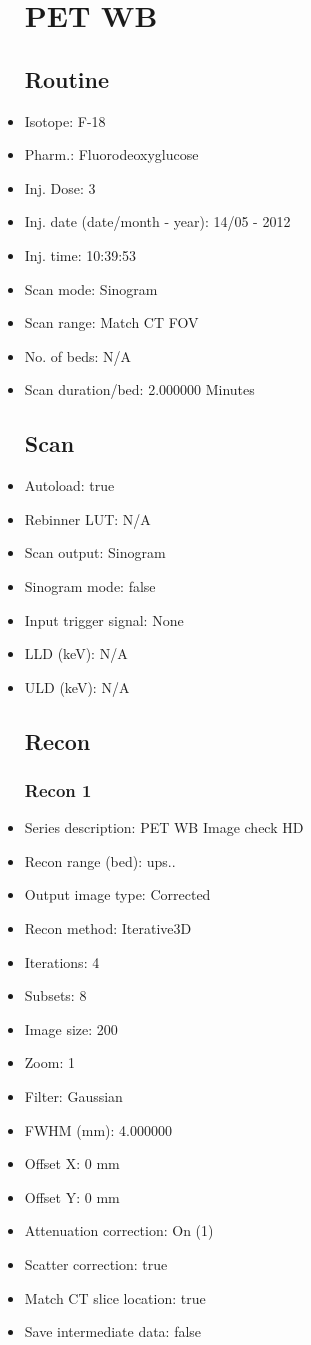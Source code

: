 \documentclass[12pt]{article}
\begin{document}
\begin{itemize}
\section{PET WB}
\subsection{Routine}
\item Isotope: F-18
\item Pharm.: Fluorodeoxyglucose
\item Inj. Dose: 3 
\item Inj. date (date/month - year): 14/05 - 2012
\item Inj. time: 10:39:53
\item Scan mode: Sinogram
\item Scan range: Match CT FOV
\item No. of beds: N/A
\item Scan duration/bed: 2.000000 Minutes
\subsection{Scan}
\item Autoload: true
\item Rebinner LUT: N/A
\item Scan output: Sinogram
\item Sinogram mode: false
\item Input trigger signal: None
\item LLD (keV): N/A
\item ULD (keV): N/A
\subsection{Recon}

\subsubsection{Recon 1}
\item Series description: PET WB Image check HD
\item Recon range (bed): ups..
\item Output image type: Corrected
\item Recon method: Iterative3D
\item Iterations: 4
\item Subsets: 8
\item Image size: 200
\item Zoom: 1
\item Filter: Gaussian
\item FWHM (mm): 4.000000
\item Offset X: 0 mm
\item Offset Y: 0 mm
\item Attenuation correction: On (1)
\item Scatter correction: true
\item Match CT slice location: true
\item Save intermediate data: false

\end{itemize}
\end{document}
